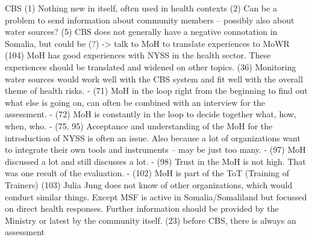CBS
(1) Nothing new in itself, often used in health contexts
(2) Can be a problem to send information about community members – possibly also about water sources? 
(5) CBS does not generally have a negative connotation in Somalia, but could be (?) -> talk to MoH to translate experiences to MoWR
(104) MoH has good experiences with NYSS in the health sector. These experiences should be translated and widened on other topics.
(36) Monitoring water sources would work well with the CBS system and fit well with the overall theme of health risks.
-	(71) MoH in the loop right from the beginning to find out what else is going on, can often be combined with an interview for the assessment.
-	(72) MoH is constantly in the loop to decide together what, how, when, who.
-	(75, 95) Acceptance and understanding of the MoH for the introduction of NYSS is often an issue. Also because a lot of organizations want to integrate their own tools and instruments – may be just too many.
-	(97) MoH discussed a lot and still discusses a lot.
-	(98) Trust in the MoH is not high. That was one result of the evaluation.
-	(102) MoH is part of the ToT (Training of Trainers)
(103) Julia Jung does not know of other organizations, which would conduct similar things. Except MSF is active in Somalia/Somaliland but focussed on direct health responses. Further information should be provided by the Ministry or latest by the community itself.
(23) before CBS, there is always an assessment


